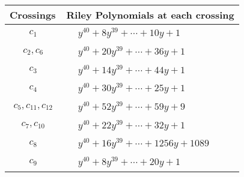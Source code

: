 \documentclass[1p]{elsarticle_modified}
\theoremstyle{definition}
\begin{document}
\begin{tabular}{m{50pt}|m{274pt}}
Crossings & \hspace{64pt}Riley Polynomials at each crossing \\
\hline $$\begin{aligned}c_{1}\end{aligned}$$&$\begin{aligned}
&y^{40}+8 y^{39}+\cdots+10 y+1
\end{aligned}$\\
\hline $$\begin{aligned}c_{2},c_{6}\end{aligned}$$&$\begin{aligned}
&y^{40}+20 y^{39}+\cdots+36 y+1
\end{aligned}$\\
\hline $$\begin{aligned}c_{3}\end{aligned}$$&$\begin{aligned}
&y^{40}+14 y^{39}+\cdots+44 y+1
\end{aligned}$\\
\hline $$\begin{aligned}c_{4}\end{aligned}$$&$\begin{aligned}
&y^{40}+30 y^{39}+\cdots+25 y+1
\end{aligned}$\\
\hline $$\begin{aligned}c_{5},c_{11},c_{12}\end{aligned}$$&$\begin{aligned}
&y^{40}+52 y^{39}+\cdots+59 y+9
\end{aligned}$\\
\hline $$\begin{aligned}c_{7},c_{10}\end{aligned}$$&$\begin{aligned}
&y^{40}+22 y^{39}+\cdots+32 y+1
\end{aligned}$\\
\hline $$\begin{aligned}c_{8}\end{aligned}$$&$\begin{aligned}
&y^{40}+16 y^{39}+\cdots+1256 y+1089
\end{aligned}$\\
\hline $$\begin{aligned}c_{9}\end{aligned}$$&$\begin{aligned}
&y^{40}+8 y^{39}+\cdots+20 y+1
\end{aligned}$\\
\hline
\end{tabular}\\~\\
\end{document}

